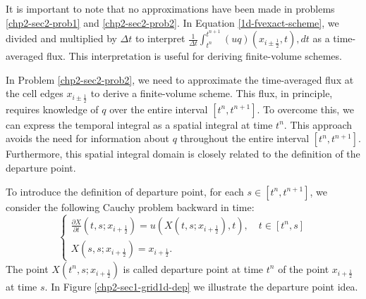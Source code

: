 It is important to note that no approximations have been made in problems \eqref{chp2-sec2-prob1} and \eqref{chp2-sec2-prob2}. 
In Equation \eqref{1d-fvexact-scheme}, we divided and multiplied by $\Delta t$ to interpret
$\frac{1}{\Delta t}\int_{t^{n}}^{t^{n+1}}({uq})(x_{i\pm \frac{1}{2}}, t) ,dt$ 
as a time-averaged flux. This interpretation is useful for deriving finite-volume schemes.

In Problem \ref{chp2-sec2-prob2}, we need to approximate the time-averaged flux at the cell edges $x_{i\pm\frac{1}{2}}$
to derive a finite-volume scheme. This flux, in principle, requires knowledge of $q$ over the entire interval $[t^n, t^{n+1}]$. 
To overcome this, we can express the temporal integral as a spatial integral at time $t^n$. 
This approach avoids the need for information about $q$ throughout the entire interval $[t^n, t^{n+1}]$. 
Furthermore, this spatial integral domain is closely related to the definition of the 
departure point. 

To introduce the definition of departure point, for each $s \in [t^n,t^{n+1}]$,
we consider the following Cauchy problem backward in time:
\begin{equation}
	\label{chp-sec-flux:analysis-eq3}
	\begin{cases}
		\frac{\partial X}{\partial t} (t,s;x_{i+\frac{1}{2}}) = u(X(t,s;x_{i+\frac{1}{2}}) ,t),\quad t\in[t^{n},s] \\
		X(s,s;x_{i+\frac{1}{2}}) = x_{i+\frac{1}{2}}.
	\end{cases}
\end{equation}
The point $X(t^n,s;x_{i+\frac{1}{2}})$ is called departure point at time $t^n$
of the point $x_{i+\frac{1}{2}}$ at time $s$.
In Figure \ref{chp2-sec1-grid1d-dep} we illustrate the departure point idea.

